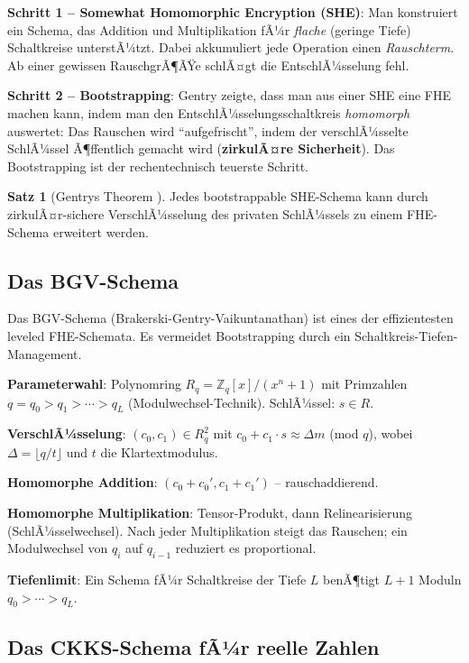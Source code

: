 ﻿\documentclass[a4paper,12pt]{scrreprt}
\theoremstyle{definition}
\newtheorem{satz}{Satz}[section]
\begin{document}
\textbf{Schritt 1 -- Somewhat Homomorphic Encryption (SHE)}: Man konstruiert ein Schema, das Addition und Multiplikation fÃ¼r \emph{flache} (geringe Tiefe) Schaltkreise unterstÃ¼tzt. Dabei akkumuliert jede Operation einen \emph{Rauschterm}. Ab einer gewissen RauschgrÃ¶ÃŸe schlÃ¤gt die EntschlÃ¼sselung fehl.

\textbf{Schritt 2 -- Bootstrapping}: Gentry zeigte, dass man aus einer SHE eine FHE machen kann, indem man den EntschlÃ¼sselungsschaltkreis \emph{homomorph} auswertet: Das Rauschen wird ``aufgefrischt'', indem der verschlÃ¼sselte SchlÃ¼ssel Ã¶ffentlich gemacht wird (\textbf{zirkulÃ¤re Sicherheit}). Das Bootstrapping ist der rechentechnisch teuerste Schritt.

\begin{satz}[Gentrys Theorem \cite{Gen09}]
Jedes bootstrappable SHE-Schema kann durch zirkulÃ¤r-sichere VerschlÃ¼sselung des privaten SchlÃ¼ssels zu einem FHE-Schema erweitert werden.
\end{satz}

\subsection{Das BGV-Schema}

Das BGV-Schema (Brakerski-Gentry-Vaikuntanathan) \cite{BGV12} ist eines der effizientesten leveled FHE-Schemata. Es vermeidet Bootstrapping durch ein Schaltkreis-Tiefen-Management.

\textbf{Parameterwahl}: Polynomring $R_q = \mathbb{Z}_q[x]/(x^n+1)$ mit Primzahlen $q = q_0 > q_1 > \cdots > q_L$ (Modulwechsel-Technik). SchlÃ¼ssel: $s \in R$.

\textbf{VerschlÃ¼sselung}: $(c_0, c_1) \in R_q^2$ mit $c_0 + c_1 \cdot s \approx \Delta m$ (mod $q$), wobei $\Delta = \lfloor q/t\rfloor$ und $t$ die Klartextmodulus.

\textbf{Homomorphe Addition}: $(c_0+c_0', c_1+c_1')$ -- rauschaddierend.

\textbf{Homomorphe Multiplikation}: Tensor-Produkt, dann Relinearisierung (SchlÃ¼sselwechsel). Nach jeder Multiplikation steigt das Rauschen; ein Modulwechsel von $q_i$ auf $q_{i-1}$ reduziert es proportional.

\textbf{Tiefenlimit}: Ein Schema fÃ¼r Schaltkreise der Tiefe $L$ benÃ¶tigt $L+1$ Moduln $q_0 > \cdots > q_L$.

\subsection{Das CKKS-Schema fÃ¼r reelle Zahlen}
\end{document}
